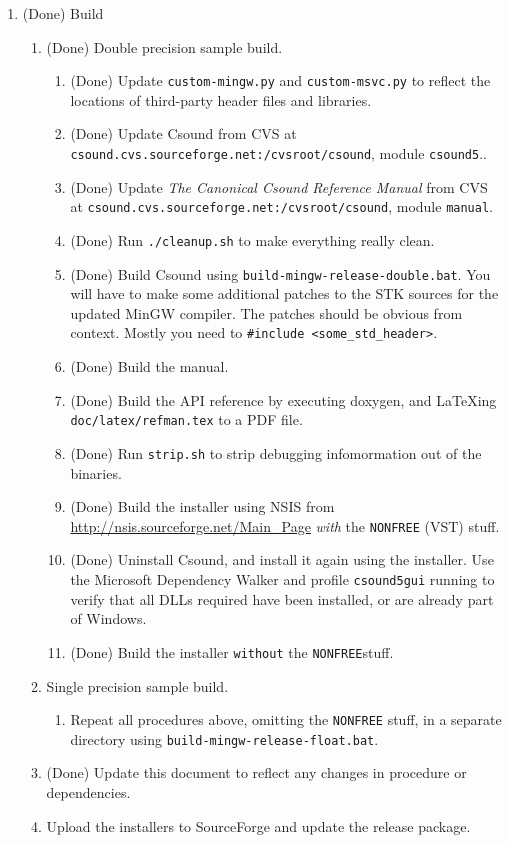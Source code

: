 \documentclass[11pt,letterpaper,onecolumn]{scrartcl}
\begin{document}
\begin{sloppypar}
\begin{enumerate}
\begin{enumerate}
		\end{enumerate}
	\item (Done) Build   
		\begin{enumerate}				
			\item (Done) Double precision sample build.
				\begin{enumerate}
		    	\item (Done) Update \texttt{custom-mingw.py} and \texttt{custom-msvc.py} to reflect the locations of third-party header files and libraries.
					\item (Done) Update Csound from CVS at \verb|csound.cvs.sourceforge.net:/cvsroot/csound|, module \texttt{csound5}..
					\item (Done) Update \emph{The Canonical Csound Reference Manual} from CVS at \verb|csound.cvs.sourceforge.net:/cvsroot/csound|, module \texttt{manual}.
					\item (Done) Run \texttt{./cleanup.sh} to make everything really clean.
			    \item (Done) Build Csound using \texttt{build-mingw-release-double.bat}. You will have to make some additional patches to the STK sources for the updated MinGW compiler. The patches should be obvious from context. Mostly you need to \verb|#include <some_std_header>|.
			    \item (Done) Build the manual.
			    \item (Done) Build the API reference by executing doxygen, and LaTeXing \texttt{doc/latex/refman.tex} to a PDF file.
			    \item (Done) Run \texttt{strip.sh} to strip debugging infomormation out of the binaries.
			    \item (Done) Build the installer using NSIS from \url{http://nsis.sourceforge.net/Main_Page} \emph{with} the \verb|NONFREE| (VST) stuff.  
			    \item (Done) Uninstall Csound, and install it again using the installer. Use the Microsoft Dependency Walker and profile \texttt{csound5gui} running to verify that all DLLs required have been installed, or are already part of Windows.
			    \item (Done) Build the installer \texttt{without} the \verb|NONFREE|stuff.   
				\end{enumerate}
			\item Single precision sample build.			
				\begin{enumerate}
					\item Repeat all procedures above, omitting the \verb|NONFREE| stuff, in a separate directory using \texttt{build-mingw-release-float.bat}. 
				\end{enumerate}
	    \item (Done) Update this document to reflect any changes in procedure or dependencies. 
	    \item Upload the installers to SourceForge and update the release package.
		\end{enumerate}
 \end{enumerate}


\end{sloppypar}
\end{document}

